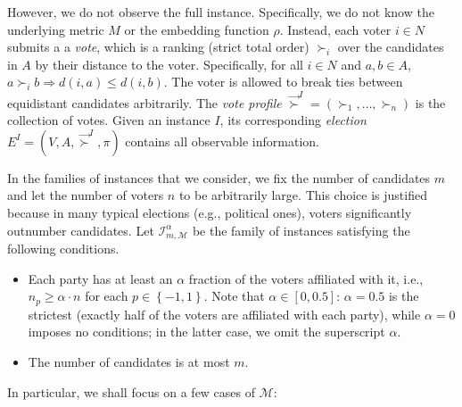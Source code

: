 \documentclass[letterpaper]{article} %
\theoremstyle{definition}
\newcommand{\set}[1]{\left\{#1\right\}}
\renewcommand{\vec}{\overrightarrow}
\newcommand{\calI}{\mathcal{I}}
\newcommand{\calM}{\mathcal{M}}
\newcommand{\vsucc}{\vec{\succ}}
\newcommand{\pleft}{-1}
\newcommand{\pright}{1}
\begin{document}
However, we do not observe the full instance. Specifically, we do not know the underlying metric $M$ or the embedding function $\rho$. Instead, each voter $i \in N$ submits a a \emph{vote}, which is a ranking (strict total order) $\succ_i$ over the candidates in $A$ by their distance to the voter. Specifically, for all $i \in N$ and $a,b \in A$, $a \succ_i b \Rightarrow d(i,a) \le d(i,b)$. The voter is allowed to break ties between equidistant candidates arbitrarily. The \emph{vote profile} $\vsucc^I = (\succ_1,\ldots,\succ_n)$ is the collection of votes. Given an instance $I$, its corresponding \emph{election} $E^I = (V,A,\vsucc^I,\pi)$ contains all observable information. 

In the families of instances that we consider, we fix the number of candidates $m$ and let the number of voters $n$ to be arbitrarily large. This choice is justified because in many typical elections (e.g., political ones), voters significantly outnumber candidates. Let $\calI^{\alpha}_{m,\calM}$ be the family of instances satisfying the following conditions.
\begin{itemize}
	\item Each party has at least an $\alpha$ fraction of the voters affiliated with it, i.e., $n_p \ge \alpha \cdot n$ for each $p \in \set{\pleft,\pright}$. Note that $\alpha \in [0,0.5]$: $\alpha = 0.5$ is the strictest (exactly half of the voters are affiliated with each party), while $\alpha=0$ imposes no conditions; in the latter case, we omit the superscript $\alpha$. 
	\item The number of candidates is at most $m$.%
	\end{itemize}
	In particular, we shall focus on a few cases of $\calM:$
\end{document}
